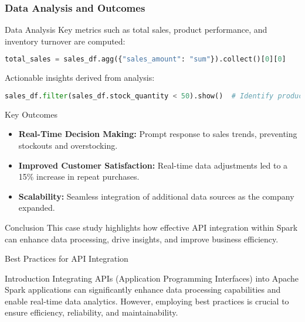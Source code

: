\documentclass[aspectratio=169]{beamer}
\begin{document}
\begin{frame}[fragile]
    \frametitle{Data Analysis and Outcomes}
    \begin{block}{Data Analysis}
        Key metrics such as total sales, product performance, and inventory turnover are computed:
        \begin{lstlisting}[language=Python]
total_sales = sales_df.agg({"sales_amount": "sum"}).collect()[0][0]
                \end{lstlisting}
        
        Actionable insights derived from analysis:
        \begin{lstlisting}[language=Python]
sales_df.filter(sales_df.stock_quantity < 50).show()  # Identify products needing restock
                \end{lstlisting}
    \end{block}
    
    \begin{block}{Key Outcomes}
        \begin{itemize}
            \item \textbf{Real-Time Decision Making:} Prompt response to sales trends, preventing stockouts and overstocking.
            \item \textbf{Improved Customer Satisfaction:} Real-time data adjustments led to a 15\% increase in repeat purchases.
            \item \textbf{Scalability:} Seamless integration of additional data sources as the company expanded.
        \end{itemize}
    \end{block}
    
    \begin{block}{Conclusion}
        This case study highlights how effective API integration within Spark can enhance data processing, drive insights, and improve business efficiency.
    \end{block}
\end{frame}

\begin{frame}{Best Practices for API Integration}
    \begin{block}{Introduction}
        Integrating APIs (Application Programming Interfaces) into Apache Spark applications can significantly enhance data processing capabilities and enable real-time data analytics. However, employing best practices is crucial to ensure efficiency, reliability, and maintainability.
    \end{block}
\end{frame}
\end{document}
